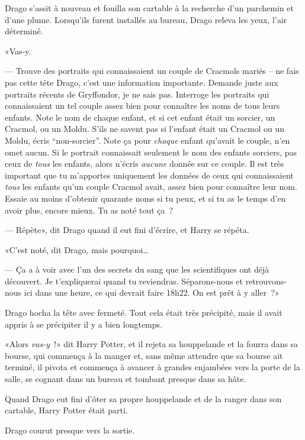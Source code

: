 Drago s'assit à nouveau et fouilla son cartable à la recherche d'un parchemin et d'une plume. Lorsqu'ils furent installés au bureau, Drago releva les yeux, l'air déterminé.

«Vas-y.

--- Trouve des portraits qui connaissaient un couple de Cracmols mariés -- ne fais pas cette tête Drago, c'est une information importante. Demande juste aux portraits récents de Gryffondor, je ne sais pas. Interroge les portraits qui connaissaient un tel couple assez bien pour connaître les noms de tous leurs enfants. Note le nom de chaque enfant, et si cet enfant était un sorcier, un Cracmol, ou un Moldu. S'ils ne savent pas si l'enfant était un Cracmol ou un Moldu, écris “non-sorcier”. Note ça pour \emph{chaque} enfant qu'avait le couple, n'en omet aucun. Si le portrait connaissait seulement le nom des enfants sorciers, pas ceux de \emph{tous} les enfants, alors n'écris \emph{aucune} donnée sur ce couple. Il est très important que tu m'apportes uniquement les données de ceux qui connaissaient \emph{tous} les enfants qu'un couple Cracmol avait, assez bien pour connaître leur nom. Essaie au moins d'obtenir quarante noms si tu peux, et si tu as le temps d'en avoir plus, encore mieux. Tu as noté tout ça~?

--- Répète», dit Drago quand il eut fini d'écrire, et Harry se répéta.

«C'est noté, dit Drago, mais pourquoi…

--- Ça a à voir avec l'un des secrets du sang que les scientifiques ont déjà découvert. Je t'expliquerai quand tu reviendras. Séparons-nous et retrouvons-nous ici dans une heure, ce qui devrait faire 18h22. On est prêt à y aller~?»

Drago hocha la tête avec fermeté. Tout cela était très précipité, mais il avait appris à se précipiter il y a bien longtemps.

«Alors \emph{vas-y}~!» dit Harry Potter, et il rejeta sa houppelande et la fourra dans sa bourse, qui commença à la manger et, sans même attendre que sa bourse ait terminé, il pivota et commença à avancer à grandes enjambées vers la porte de la salle, se cognant dans un bureau et tombant presque dans sa hâte.

Quand Drago eut fini d'ôter sa propre houppelande et de la ranger dans son cartable, Harry Potter était parti.

Drago courut presque vers la sortie.~
